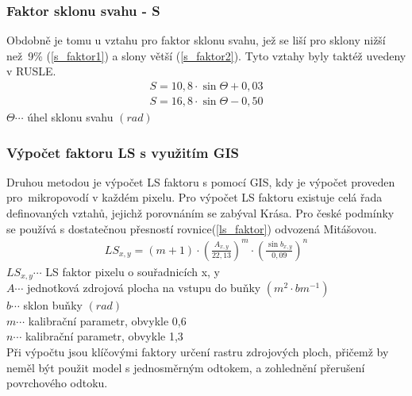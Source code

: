 \subsubsection{Faktor sklonu svahu - S} 
Obdobně je tomu u vztahu pro faktor sklonu svahu, jež se liší pro
sklony nižší než~9\% (\ref{s_faktor1}) a slony větší
(\ref{s_faktor2}). Tyto vztahy byly taktéž uvedeny v
RUSLE\cite{rusle1997}.
\begin{align}
   \label{s_faktor1} S=10,8\cdot\sin\Theta + 0,03
\end{align}
\vspace{-40pt}
\begin{align}
   \label{s_faktor2} S=16,8\cdot\sin\Theta - 0,50
\end{align}
\hspace*{2cm}$\Theta \cdots$ úhel sklonu svahu $\left( rad \right)$

\subsubsection{Výpočet faktoru LS s využitím GIS} 
Druhou metodou je výpočet LS faktoru s pomocí GIS, kdy je výpočet
proveden pro~mikropovodí v každém pixelu. Pro výpočet LS faktoru
existuje celá řada definovaných vztahů, jejichž porovnáním se zabýval
Krása\cite{Krasa2010}. Pro české podmínky se používá s dostatečnou
přesností rovnice(\ref{ls_faktor}) odvozená
Mitášovou\cite{Mitasova1998}.\cite{Dostal2014}
\begin{align}
   \label{ls_faktor} LS_{x,y}=\left( m+1 \right)\cdot\left(\frac{A_{x,y}}{22,13}\right)^m \cdot \left(\frac{\sin b_{x,y}}{0,09}\right)^n
\end{align}
\hspace*{2cm}$LS_{x,y} \cdots$ LS faktor pixelu o souřadnicích x, y
\\ \hspace*{2cm}$A \cdots$ jednotková zdrojová plocha na vstupu do
buňky $\left( m^2\cdot bm^{-1} \right)$ \\
\hspace*{2cm}$b \cdots$ sklon buňky $\left( rad \right)$ \\
\hspace*{2cm}$m \cdots$ kalibrační parametr, obvykle 0,6\\
\hspace*{2cm}$n \cdots$ kalibrační parametr, obvykle 1,3\\

Při výpočtu jsou klíčovými faktory určení rastru zdrojových ploch,
přičemž by neměl být použit model s jednosměrným odtokem, a zohlednění
přerušení povrchového odtoku.\cite{Krasa2010}
\newpage
